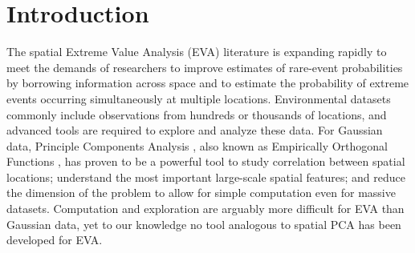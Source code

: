 \documentclass[aoas]{imsart}
\begin{document}
{}

\section{Introduction}\label{ebs:intro}

The spatial Extreme Value Analysis (EVA) literature is expanding rapidly \citep{Davison2012} to meet the demands of researchers to improve estimates of rare-event probabilities by borrowing information across space and to estimate the probability of extreme events occurring simultaneously at multiple locations.
Environmental datasets commonly include observations from hundreds or thousands of locations, and advanced tools are required to explore and analyze these data.
For Gaussian data, Principle Components Analysis \citep[PCA]{Everitt2008}, also known as Empirically Orthogonal Functions \citep[EOF]{Toggweiler2001}, has proven to be a powerful tool to study correlation between spatial locations; understand the most important large-scale spatial features; and reduce the dimension of the problem to allow for simple computation even for massive datasets.
Computation and exploration are arguably more difficult for EVA than Gaussian data, yet to our knowledge no tool analogous to spatial PCA has been developed for EVA.
\end{document}
